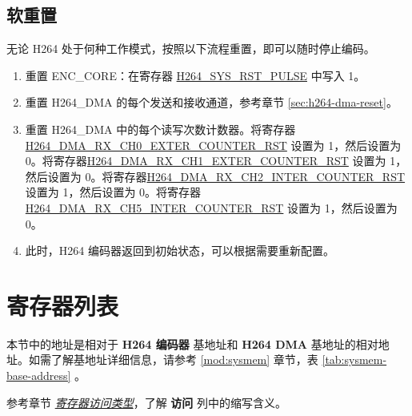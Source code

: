 \documentclass[main\_\_CN.tex]{subfiles}
\begin{document}
\subsection{软重置}\label{sec:h264-soft-rst}
无论 H264 处于何种工作模式，按照以下流程重置，即可以随时停止编码。
\begin{enumerate}
    \item 重置 ENC\_CORE：在寄存器 \hyperref[fielddesc:H264SYSRSTPULSE]{H264\_SYS\_RST\_PULSE} 中写入 1。
    \item 重置 H264\_DMA 的每个发送和接收通道，参考章节 \ref{sec:h264-dma-reset}。
    \item 重置 H264\_DMA 中的每个读写次数计数器。将寄存器 \hyperref[fielddesc:H264DMARXCH0EXTERCOUNTERRST]{H264\_DMA\_RX\_CH0\_EXTER\_COUNTER\_RST} 设置为 1，然后设置为 0。将寄存器\hyperref[fielddesc:H264DMARXCH1EXTERCOUNTERRST]{H264\_DMA\_RX\_CH1\_EXTER\_COUNTER\_RST} 设置为 1，然后设置为 0。将寄存器\hyperref[fielddesc:H264DMARXCH2INTERCOUNTERRST]{H264\_DMA\_RX\_CH2\_INTER\_COUNTER\_RST} 设置为 1，然后设置为 0。将寄存器 \hyperref[fielddesc:H264DMARXCH5INTERCOUNTERRST]{H264\_DMA\_RX\_CH5\_INTER\_COUNTER\_RST} 设置为 1，然后设置为 0。
    \item 此时，H264 编码器返回到初始状态，可以根据需要重新配置。
\end{enumerate}











\clearpage
\section{寄存器列表}

本节中的地址是相对于 \textbf{H264 编码器} 基地址和 \textbf{H264 DMA} 基地址的相对地址。如需了解基地址详细信息，请参考 \ref{mod:sysmem} \textit{} 章节，表 \ref{tab:sysmem-base-address} \textit{}。

参考章节 \hyperref[glossary-access-types]{\textit{寄存器访问类型}}，了解 \textbf{访问} 列中的缩写含义。
\end{document}

